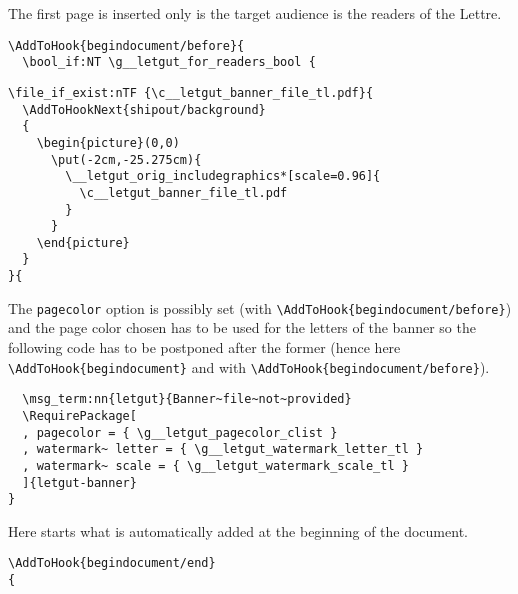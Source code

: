 \documentclass{letgut}
\begin{document}
The first page is inserted only is the target audience is the readers of the
Lettre.

\begin{lstlisting}
\AddToHook{begindocument/before}{
  \bool_if:NT \g__letgut_for_readers_bool {
\end{lstlisting}

\begin{lstlisting}
\file_if_exist:nTF {\c__letgut_banner_file_tl.pdf}{
  \AddToHookNext{shipout/background}
  {
    \begin{picture}(0,0)
      \put(-2cm,-25.275cm){
        \__letgut_orig_includegraphics*[scale=0.96]{
          \c__letgut_banner_file_tl.pdf
        }
      }
    \end{picture}
  }
}{
\end{lstlisting}

The \lstinline+pagecolor+ option is possibly set (with \lstinline+\AddToHook{begindocument/before}+)
and the page color chosen has to be used for the letters of the banner so the
following code has to be postponed after the former (hence here
\lstinline+\AddToHook{begindocument}+ and with \lstinline+\AddToHook{begindocument/before}+).

\begin{lstlisting}
  \msg_term:nn{letgut}{Banner~file~not~provided}
  \RequirePackage[
  , pagecolor = { \g__letgut_pagecolor_clist }
  , watermark~ letter = { \g__letgut_watermark_letter_tl }
  , watermark~ scale = { \g__letgut_watermark_scale_tl }
  ]{letgut-banner}
}
\end{lstlisting}

Here starts what is automatically added at the beginning of the document.

\begin{lstlisting}
\AddToHook{begindocument/end}
{
\end{lstlisting}
\end{document}
